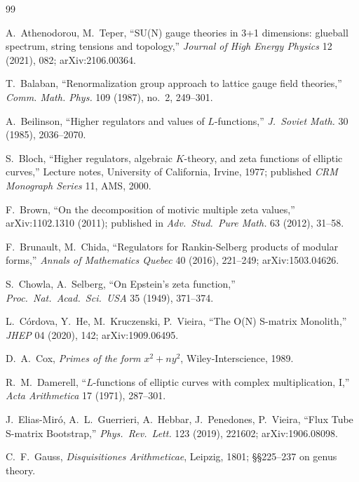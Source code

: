 \documentclass[11pt]{amsart}
\theoremstyle{definition}
\theoremstyle{remark}
\begin{document}

\begin{thebibliography}{99}

 A.~Athenodorou, M.~Teper, ``SU(N) gauge
theories in 3+1 dimensions: glueball spectrum, string tensions and
topology,'' \emph{Journal of High Energy Physics} 12 (2021), 082;
arXiv:2106.00364.

 T.~Balaban, ``Renormalization group approach to
lattice gauge field theories,'' \emph{Comm. Math. Phys.} 109 (1987),
no.~2, 249--301.

 A.~Beilinson, ``Higher regulators and values
of $L$-functions,'' \emph{J.\ Soviet Math.} 30 (1985), 2036--2070.

 S.~Bloch, ``Higher regulators, algebraic
$K$-theory, and zeta functions of elliptic curves,'' Lecture notes,
University of California, Irvine, 1977; published \emph{CRM Monograph
Series} 11, AMS, 2000.

 F.~Brown, ``On the decomposition of motivic
multiple zeta values,'' arXiv:1102.1310 (2011); published in
\emph{Adv.\ Stud.\ Pure Math.} 63 (2012), 31--58.

 F.~Brunault, M.~Chida, ``Regulators for
Rankin-Selberg products of modular forms,'' \emph{Annals of
Mathematics Quebec} 40 (2016), 221--249; arXiv:1503.04626.

 S.~Chowla, A.~Selberg, ``On Epstein's
zeta function,'' \emph{Proc.\ Nat.\ Acad.\ Sci.\ USA} 35 (1949),
371--374.

 L.~C\'ordova, Y.~He,
M.~Kruczenski, P.~Vieira, ``The O(N) S-matrix Monolith,''
\emph{JHEP} 04 (2020), 142; arXiv:1909.06495.

 D.~A.~Cox, \emph{Primes of the form $x^2 + ny^2$},
Wiley-Interscience, 1989.

 R.~M.~Damerell, ``$L$-functions of elliptic
curves with complex multiplication, I,'' \emph{Acta Arithmetica}
17 (1971), 287--301.

 J.~Elias-Mir\'o, A.~L.~Guerrieri,
A.~Hebbar, J.~Penedones, P.~Vieira, ``Flux Tube S-matrix Bootstrap,''
\emph{Phys.\ Rev.\ Lett.} 123 (2019), 221602; arXiv:1906.08098.

 C.~F.~Gauss, \emph{Disquisitiones Arithmeticae},
Leipzig, 1801; \S\S 225--237 on genus theory.


\end{thebibliography}
\end{document}
